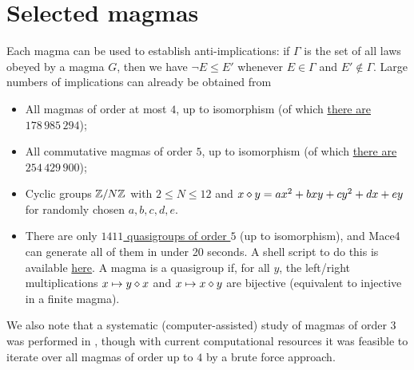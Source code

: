 \chapter{Selected magmas}\label{selected-magmas-chapter}

Each magma can be used to establish anti-implications: if $\Gamma$ is the set of all laws obeyed by a magma $G$, then we have $\neg E \leq E'$ whenever $E \in \Gamma$ and $E' \not \in \Gamma$.  Large numbers of implications can already be obtained from

\begin{itemize}
  \item All magmas of order at most $4$, up to isomorphism (of which \href{https://oeis.org/A001329}{there are $178\,985\,294$});
  \item All commutative magmas of order $5$, up to isomorphism (of which \href{https://oeis.org/A001425}{there are $254\,429\,900$});
  \item Cyclic groups $\mathbb{Z}/N\mathbb{Z}$ with $2 \leq N \leq 12$ and $x \diamond y = ax^2+bxy+cy^2+dx+ey$ for randomly chosen $a,b,c,d,e$.
  \item There are only \href{https://oeis.org/A057991}{$1411$ quasigroups of order $5$} (up to isomorphism), and Mace4 can generate all of them in under 20 seconds. A shell script to do this is available \href{https://github.com/zaklogician/equational_theories/tree/cancellative_magmas/scripts/cancellative_magmas}{here}. A magma is a quasigroup if, for all $y$, the left/right multiplications $x\mapsto y\diamond x$ and $x\mapsto x\diamond y$ are bijective (equivalent to injective in a finite magma).
\end{itemize}

We also note that a systematic (computer-assisted) study of magmas of order $3$ was performed in \cite{berman-burris}, though with current computational resources it was feasible to iterate over all magmas of order up to $4$ by a brute force approach.

